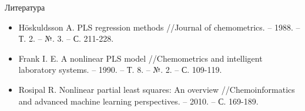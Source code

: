 \documentclass{beamer}
\begin{document}
    


\begin{frame}{Литература}
\begin{itemize}
  \item \footnotesize{Höskuldsson A. PLS regression methods //Journal of chemometrics. – 1988. – Т. 2. – №. 3. – С. 211-228.}
  \newline
  \item \footnotesize{Frank I. E. A nonlinear PLS model //Chemometrics and intelligent laboratory systems. – 1990. – Т. 8. – №. 2. – С. 109-119.}
  \newline
  \item \footnotesize{Rosipal R. Nonlinear partial least squares: An overview //Chemoinformatics and advanced machine learning perspectives. – 2010. – С. 169-189.}
  \newline
\end{itemize}
\end{frame}
\end{document}
